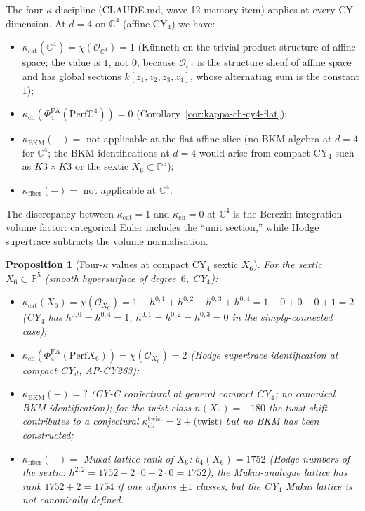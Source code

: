 \documentclass[11pt]{article}
\providecommand{\C}{\mathbb{C}}
\providecommand{\cO}{\mathcal{O}}
\providecommand{\Perf}{\mathrm{Perf}}
\providecommand{\PhiFA}{\Phi^{\mathrm{FA}}}
\newtheorem{proposition}[theorem]{Proposition}
\theoremstyle{definition}
\begin{document}
The four-$\kappa$ discipline (CLAUDE.md, wave-12 memory item) applies
at every CY dimension. At $d = 4$ on $\C^4$ (affine CY$_4$) we have:
\begin{itemize}[leftmargin=2em]
  \item $\kappa_{\mathrm{cat}}(\C^4) = \chi(\cO_{\C^4}) = 1$
  (K\"unneth on the trivial product structure of affine space;
  the value is $1$, not $0$, because $\cO_{\C^4}$ is the structure
  sheaf of affine space and has global sections $k[z_1, z_2, z_3, z_4]$,
  whose alternating sum is the constant $1$);
  \item $\kappa_{\mathrm{ch}}(\PhiFA_4(\Perf \C^4)) = 0$
  (Corollary~\ref{cor:kappa-ch-cy4-flat});
  \item $\kappa_{\mathrm{BKM}}(-) =$ not applicable at the flat affine
  slice (no BKM algebra at $d = 4$ for $\C^4$; the BKM identifications
  at $d = 4$ would arise from compact CY$_4$ such as
  $K3 \times K3$ or the sextic $X_6 \subset \mathbb{P}^5$);
  \item $\kappa_{\mathrm{fiber}}(-) =$ not applicable at $\C^4$.
\end{itemize}
The discrepancy between $\kappa_{\mathrm{cat}} = 1$ and
$\kappa_{\mathrm{ch}} = 0$ at $\C^4$ is the Berezin-integration volume
factor: categorical Euler includes the ``unit section,'' while
Hodge supertrace subtracts the volume normalisation.

\begin{proposition}[Four-$\kappa$ values at compact CY$_4$ sextic $X_6$]
\label{prop:four-kappa-sextic}
For the sextic $X_6 \subset \mathbb{P}^5$ (smooth hypersurface of degree~$6$,
CY$_4$):
\begin{itemize}[leftmargin=2em]
  \item $\kappa_{\mathrm{cat}}(X_6) = \chi(\cO_{X_6}) = 1 - h^{0,1} + h^{0,2} - h^{0,3} + h^{0,4}
  = 1 - 0 + 0 - 0 + 1 = 2$
  (CY$_4$ has $h^{0,0} = h^{0,4} = 1$, $h^{0,1} = h^{0,2} = h^{0,3} = 0$
  in the simply-connected case);
  \item $\kappa_{\mathrm{ch}}(\PhiFA_4(\Perf X_6)) = \chi(\cO_{X_6}) = 2$
  (Hodge supertrace identification at compact CY$_d$, AP-CY263);
  \item $\kappa_{\mathrm{BKM}}(-) = ?$ (CY-C conjectural at general compact
  CY$_4$; no canonical BKM identification); for the twist class
  $n(X_6) = -180$ the twist-shift contributes to a conjectural
  $\kappa_{\mathrm{ch}}^{\mathrm{twist}} = 2 + \text{(twist)}$ but
  no BKM has been constructed;
  \item $\kappa_{\mathrm{fiber}}(-) =$ Mukai-lattice rank of $X_6$:
  $b_4(X_6) = 1752$ (Hodge numbers of the sextic: $h^{2,2} = 1752 - 2 \cdot 0 - 2 \cdot 0 = 1752$);
  the Mukai-analogue lattice has rank $1752 + 2 = 1754$ if one adjoins
  $\pm 1$ classes, but the CY$_4$ Mukai lattice is not canonically
  defined.
\end{itemize}
\end{proposition}
\end{document}
